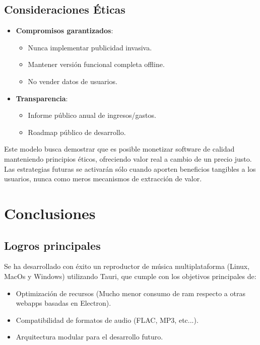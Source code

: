 \documentclass[11pt, a4paper]{article}
\begin{document}
  \subsection{Consideraciones Éticas}

  \begin{itemize}
    \item \textbf{Compromisos garantizados}:
      \begin{itemize}
        \item Nunca implementar publicidad invasiva.
        \item Mantener versión funcional completa offline.
        \item No vender datos de usuarios.
      \end{itemize}

    \item \textbf{Transparencia}:
      \begin{itemize}
        \item Informe público anual de ingresos/gastos.
        \item Roadmap público de desarrollo.
      \end{itemize}
  \end{itemize}

  Este modelo busca demostrar que es posible monetizar software de calidad manteniendo principios éticos, ofreciendo valor real a cambio de un precio justo. Las estrategias futuras se activarán sólo cuando aporten beneficios tangibles a los usuarios, nunca como meros mecanismos de extracción de valor.

\section{Conclusiones}

        \subsection{Logros principales}

        Se ha desarrollado con éxito un reproductor de música multiplataforma (Linux, MacOs y Windows) utilizando Tauri, que cumple con los objetivos principales de:

        \begin{itemize}
            \item Optimización de recursos (Mucho menor consumo de ram respecto a otras webapps basadas en Electron).
            \item Compatibilidad de formatos de audio (FLAC, MP3, etc...).
            \item Arquitectura modular para el desarrollo futuro.
        \end{itemize}
\end{document}
